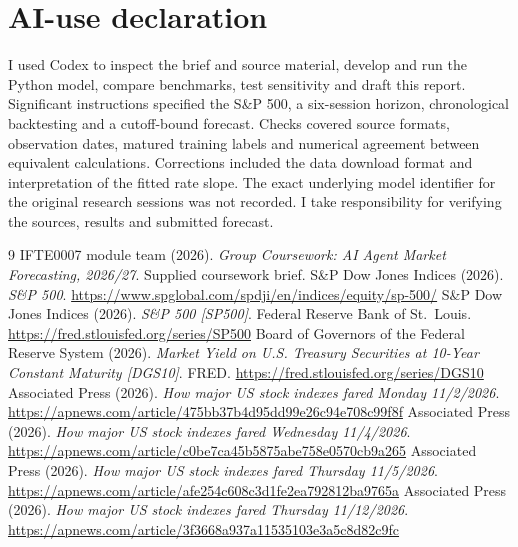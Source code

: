 \documentclass[11pt,a4paper]{article}
\begin{document}
\section*{AI-use declaration}
I used Codex to inspect the brief and source material, develop and run the Python model, compare benchmarks, test sensitivity and draft this report. Significant instructions specified the S\&P 500, a six-session horizon, chronological backtesting and a cutoff-bound forecast. Checks covered source formats, observation dates, matured training labels and numerical agreement between equivalent calculations. Corrections included the data download format and interpretation of the fitted rate slope. The exact underlying model identifier for the original research sessions was not recorded. I take responsibility for verifying the sources, results and submitted forecast.

\begin{thebibliography}{9}
 IFTE0007 module team (2026). \emph{Group Coursework: AI Agent Market Forecasting, 2026/27}. Supplied coursework brief.
 S\&P Dow Jones Indices (2026). \emph{S\&P 500}. \url{https://www.spglobal.com/spdji/en/indices/equity/sp-500/}
 S\&P Dow Jones Indices (2026). \emph{S\&P 500 [SP500]}. Federal Reserve Bank of St.\ Louis. \url{https://fred.stlouisfed.org/series/SP500}
 Board of Governors of the Federal Reserve System (2026). \emph{Market Yield on U.S. Treasury Securities at 10-Year Constant Maturity [DGS10]}. FRED. \url{https://fred.stlouisfed.org/series/DGS10}
 Associated Press (2026). \emph{How major US stock indexes fared Monday 11/2/2026}. \url{https://apnews.com/article/475bb37b4d95dd99e26c94e708c99f8f}
 Associated Press (2026). \emph{How major US stock indexes fared Wednesday 11/4/2026}. \url{https://apnews.com/article/c0be7ca45b5875abe758e0570cb9a265}
 Associated Press (2026). \emph{How major US stock indexes fared Thursday 11/5/2026}. \url{https://apnews.com/article/afe254c608c3d1fe2ea792812ba9765a}
 Associated Press (2026). \emph{How major US stock indexes fared Thursday 11/12/2026}. \url{https://apnews.com/article/3f3668a937a11535103e3a5c8d82c9fc}
\end{thebibliography}
\end{document}
